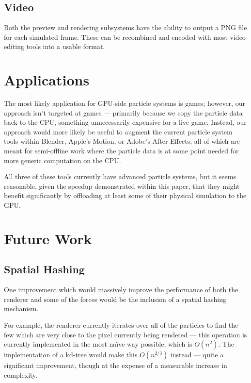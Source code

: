 \documentclass{acmsiggraph}
\begin{document}
\subsection{Video}

Both the preview and rendering subsystems have the ability to output a PNG file for each simulated frame. These can be recombined and encoded with most video editing tools into a usable format.

\section{Applications}

The most likely application for GPU-side particle systems is games; however, our approach isn't targeted at games --- primarily because we copy the particle data back to the CPU, something unnecessarily expensive for a live game. Instead, our approach would more likely be useful to augment the current particle system tools within Blender, Apple's Motion, or Adobe's After Effects, all of which are meant for semi-offline work where the particle data is at some point needed for more generic computation on the CPU.

All three of these tools currently have advanced particle systems, but it seems reasonable, given the speedup demonstrated within this paper, that they might benefit significantly by offloading at least some of their physical simulation to the GPU.

\section{Future Work}

\subsection{Spatial Hashing}

One improvement which would massively improve the performance of both the renderer and some of the forces would be the inclusion of a spatial hashing mechanism.

For example, the renderer currently iterates over all of the particles to find the few which are very close to the pixel currently being rendered --- this operation is currently implemented in the most na\"{i}ve way possible, which is $O(n^2)$. The implementation of a kd-tree would make this $O(n^{2/3})$ instead --- quite a significant improvement, though at the expense of a measurable increase in complexity.
\end{document}
